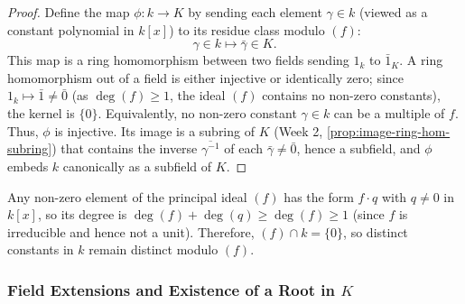 \begin{content}

\begin{proof}
Define the map $\phi \colon k \to K$ by sending each element $\gamma \in k$ (viewed as a constant polynomial in $k[x]$) to its residue class modulo $(f)$:
\[
\gamma \in k \longmapsto \bar{\gamma} \in K.
\]
This map is a ring homomorphism between two fields sending $1_k$ to $\bar{1}_K$. A ring homomorphism out of a field is either injective or identically zero; since $1_k \mapsto \bar{1} \neq \bar{0}$ (as $\deg(f) \ge 1$, the ideal $(f)$ contains no non-zero constants), the kernel is $\{0\}$. Equivalently, no non-zero constant $\gamma \in k$ can be a multiple of $f$. Thus, $\phi$ is injective. Its image is a subring of $K$ (Week 2, \cref{prop:image-ring-hom-subring}) that contains the inverse $\overline{\gamma^{-1}}$ of each $\bar{\gamma} \neq \bar{0}$, hence a subfield, and $\phi$ embeds $k$ canonically as a subfield of $K$.
\end{proof}

\begin{steps}
Any non-zero element of the principal ideal $(f)$ has the form $f \cdot q$ with $q \neq 0$ in $k[x]$, so its degree is $\deg(f) + \deg(q) \ge \deg(f) \ge 1$ (since $f$ is irreducible and hence not a unit). Therefore, $(f) \cap k = \{0\}$, so distinct constants in $k$ remain distinct modulo $(f)$.
\end{steps}
\end{content}

\subsubsection{Field Extensions and Existence of a Root in \texorpdfstring{$K$}{K}}

